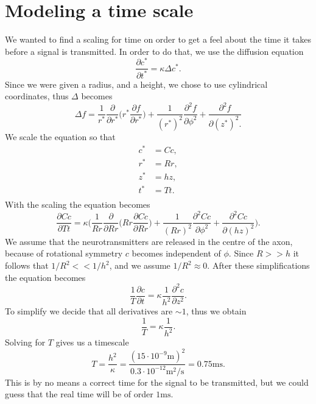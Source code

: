 \section{Modeling a time scale}
We wanted to find a scaling for time on order to get a feel about the time it takes before a signal is transmitted. In order to do that, we use the diffusion equation
$$\frac{\partial c^{*}}{\partial t^{*}} = \kappa \Delta c^{*}.$$
Since we were given a radius, and a height, we chose to use cylindrical coordinates, thus $\Delta$ becomes
$$ \Delta f = \frac{1}{r^{*}} \frac{\partial}{\partial r^{*}} \Big( r^{*} \frac{\partial f}{\partial r^{*}} \Big) +\frac{1}{(r^{*})^2}\frac{\partial^2 f}{\partial \phi^2} + \frac{\partial^2 f}{\partial (z^{*})^2.} $$
We scale the equation so that
$$\begin{array}{lr}
c^{*} &= Cc,\\ r^{*} &=Rr,\\ z^{*} &= hz,\\ t^* &=Tt.\\
\end{array}$$
With the scaling the equation becomes
$$\frac{\partial Cc}{\partial Tt} = \kappa \Bigg( \frac{1}{Rr} \frac{\partial }{\partial Rr} \Big( Rr \frac{\partial Cc}{\partial Rr} \Big) +\frac{1}{(Rr)^2}\frac{\partial^2 Cc}{\partial \phi^2} + \frac{\partial^2 Cc}{\partial (hz)^2} \Bigg). $$
We assume that the neurotransmitters are released in the centre of the axon, because of rotational symmetry $c$ becomes independent of $\phi$. Since $R >> h$ it follows that $1/R^2<<1/h^2$, and we assume $1/R^2 \approx 0$. After these simplifications the equation becomes
$$\frac{1}{T} \frac{\partial c}{\partial t} = \kappa  \frac{1}{h^2}\frac{\partial^2 c}{\partial z^2} . $$
To simplify we decide that all derivatives are $ \sim 1 $, thus we obtain
$$\frac{1}{T}  = \kappa \frac{1}{h^2}.  $$
Solving for $T$ gives us a timescale
$$T = \frac{h^2}{\kappa} = \frac{(15\cdot 10^{-9}\text{m})^2}{0.3\cdot 10^{-12} \text{m$^2$/s}} = 0.75 \text{ms}. $$
This is by no means a correct time for the signal to be transmitted, but we could guess that the real time will be of order $1 \text{ms}$.